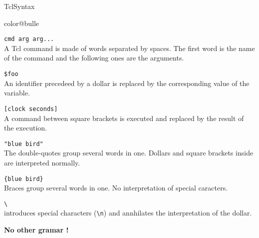 \documentclass[a4paper,landscape,smooth]{show}
\begin{document}

\begin{part}{Tcl}{Syntax}
   \vfill
   \begin{bitemize}{color@bulle}
      \item \texttt{cmd arg arg...} \\
	 A Tcl command is made of words separated by
	 spaces. The first word is the name of the command and the following
	ones are the arguments. 

      \item \texttt{\$foo} \\ 
	 An identifier precedeed by a dollar is replaced by the corresponding
value of the variable.

      \item \texttt{[clock seconds]} \\
	 A command between square brackets is executed and replaced by the
result of the execution.

      \item \texttt{"blue bird"} \\
         The double-quotes group several words in one.
         Dollars and square brackets inside are interpreted normally.

      \item \texttt{\{blue bird\}} \\
	 Braces group several words in one. No interpretation of special
	 caracters. 

      \item \verb|\| \\
	 introduces special characters  (\verb|\n|) and annhilates the
interpretation of the dollar.

   \end{bitemize}

   \begin{center}
 {\bf No other gramar !}
   \end{center}

   \vfill
\end{part}

\end{document}
